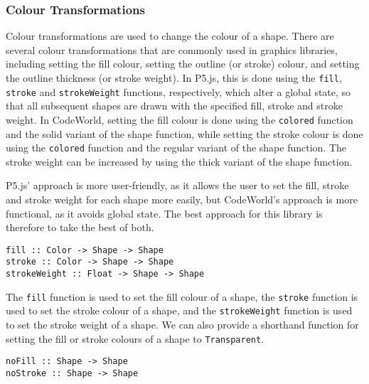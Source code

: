 \documentclass[../main.tex]{subfiles}
\begin{document}
            \subsubsection{Colour Transformations}
                Colour transformations are used to change the colour of a shape.
                There are several colour transformations that are commonly used in graphics
                    libraries, including setting the fill colour, setting the outline (or stroke)
                    colour, and setting the outline thickness (or stroke weight).
                In P5.js, this is done using the \texttt{fill}, \texttt{stroke} and
                    \texttt{strokeWeight} functions, respectively, which alter a global state, so
                    that all subsequent shapes are drawn with the specified fill, stroke and stroke
                    weight.
                In CodeWorld, setting the fill colour is done using the \texttt{colored}
                    function and the solid variant of the shape function, while setting the stroke
                    colour is done using the \texttt{colored} function and the regular variant of
                    the shape function.
                The stroke weight can be increased by using the thick variant of the shape
                    function.

                P5.js' approach is more user-friendly, as it allows the user to set the fill,
                    stroke and stroke weight for each shape more easily, but CodeWorld's approach
                    is more functional, as it avoids global state.
                The best approach for this library is therefore to take the best of both.

                \begin{lstlisting}[label={lst:colour}, caption={The colour transformation functions.}]
fill :: Color -> Shape -> Shape
stroke :: Color -> Shape -> Shape
strokeWeight :: Float -> Shape -> Shape\end{lstlisting}

                The \texttt{fill} function is used to set the fill colour of a shape, the
                    \texttt{stroke} function is used to set the stroke colour of a shape, and the
                    \texttt{strokeWeight} function is used to set the stroke weight of a shape.
                We can also provide a shorthand function for setting the fill or stroke colours
                    of a shape to \texttt{Transparent}.

                \begin{lstlisting}[label={lst:shorthandColour}, caption={The shorthand colour transformation functions.}]
noFill :: Shape -> Shape
noStroke :: Shape -> Shape\end{lstlisting}
\end{document}
